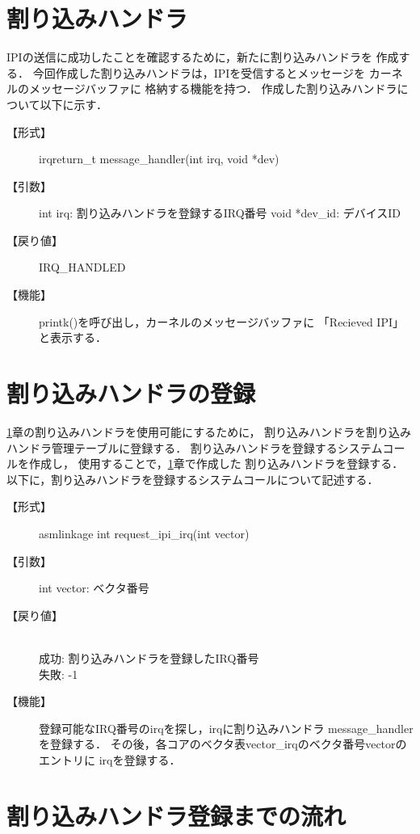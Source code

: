 \documentclass[12pt]{jsarticle}
\begin{document}
\section{割り込みハンドラ}\label{interrupt_handler}
IPIの送信に成功したことを確認するために，新たに割り込みハンドラを
作成する．
今回作成した割り込みハンドラは，IPIを受信するとメッセージを
カーネルのメッセージバッファに
格納する機能を持つ．
作成した割り込みハンドラについて以下に示す．
\begin{description}
    \item[【形式】]
 irqreturn\_t message\_handler(int irq, void *dev)
    \item[【引数】]
 int irq: 割り込みハンドラを登録するIRQ番号
        void *dev\_id: デバイスID
    \item[【戻り値】]
 IRQ\_HANDLED
    \item[【機能】]
 printk()を呼び出し，カーネルのメッセージバッファに
        「Recieved IPI」と表示する．
\end{description}
\section{割り込みハンドラの登録}
\ref{interrupt_handler}章の割り込みハンドラを使用可能にするために，
割り込みハンドラを割り込みハンドラ管理テーブルに登録する．
割り込みハンドラを登録するシステムコールを作成し，
使用することで，\ref{interrupt_handler}章で作成した
割り込みハンドラを登録する．
以下に，割り込みハンドラを登録するシステムコールについて記述する．
\begin{description}
    \item[【形式】]
        asmlinkage int request\_ipi\_irq(int vector)
    \item[【引数】]
        int vector: ベクタ番号
    \item[【戻り値】]~\\
        成功: 割り込みハンドラを登録したIRQ番号\\
        失敗: -1
    \item[【機能】]
        登録可能なIRQ番号のirqを探し，irqに割り込みハンドラ
        message\_handlerを登録する．
        その後，各コアのベクタ表vector\_irqのベクタ番号vectorのエントリに
        irqを登録する．
\end{description}

\section{割り込みハンドラ登録までの流れ}
\end{document}

